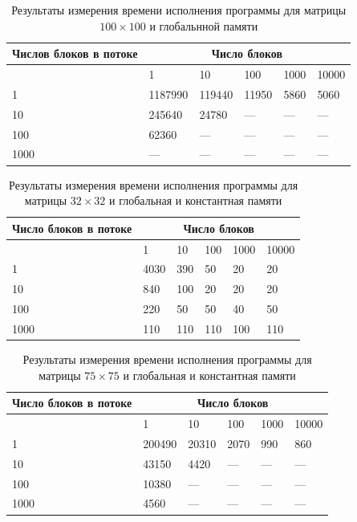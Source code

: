 \documentclass[a4paper, final]{article}
\begin{document}
\begin{table}[H]
    \centering
    \caption{Результаты измерения времени исполнения программы для матрицы $100 \times 100$ и глобальнной памяти}
    \footnotesize
    \begin{tabularx}{\textwidth}{|X|X|X|X|X|X|}
    \hline
    \textbf{Числов блоков в потоке} & \multicolumn{5}{|c|}{\textbf{Число блоков}} \\ 
    \hline
    &  1&	10&	100&	1000&	10000 \\
    \hline
    1	&1187990	&119440	&11950&	5860&	5060\\
    \hline
    10	&245640	&24780   &	---&	---	&---\\
    \hline
    100&	62360 &	---	&---	&---&	---\\
    \hline
    1000&	---&	---	&---	&---&	---\\
    \hline
    \end{tabularx}
\end{table}

\begin{table}[H]
    \centering
    \caption{Результаты измерения времени исполнения программы для матрицы $32 \times 32$ и глобальная и константная памяти}
    \footnotesize
    \begin{tabularx}{\textwidth}{|X|X|X|X|X|X|}
    \hline
    \textbf{Число блоков в потоке} & \multicolumn{5}{|c|}{\textbf{Число блоков}} \\ 
    \hline
    &  1&	10&	100&	1000&	10000 \\
    \hline
    1&	4030&	390&	50	&20	&20\\
    \hline
    10&	840&	100	&20	&20&	20\\
    \hline
    100&	220&	50&	50&	40&	50\\
    \hline
    1000&	110&	110&	110& 100&	110\\
    \hline
    \end{tabularx}
\end{table}

\begin{table}[H]
    \centering
    \caption{Результаты измерения времени исполнения программы для матрицы $75 \times 75$ и глобальная и константная памяти}
    \footnotesize
    \begin{tabularx}{\textwidth}{|X|X|X|X|X|X|}
    \hline
    \textbf{Число блоков в потоке} & \multicolumn{5}{|c|}{\textbf{Число блоков}} \\ 
    \hline
    &  1&	10&	100&	1000&	10000 \\
    \hline
    1&	200490&	20310&	2070&	990&	860\\
    \hline
    10&	43150&	4420&	---&	---&	---\\
    \hline
    100&	10380&	---&	---&	---&	---\\
    \hline
    1000&	4560&	---&	---&	---&	---\\
    \hline
    \end{tabularx}
\end{table}
\end{document}
